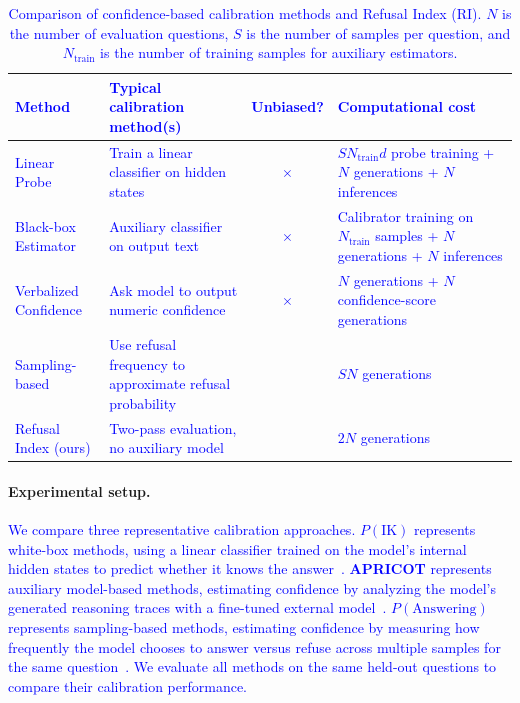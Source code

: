 \documentclass{article} %
\theoremstyle{definition}
\newcommand{\wigglyblue}[1]{\textcolor{blue}{#1}}
\begin{document}
\begin{table}[t]
    \centering
    \footnotesize
    \caption{\wigglyblue{Comparison of confidence-based calibration methods and Refusal Index (RI). $N$ is the number of evaluation questions, $S$ is the number of samples per question, and $N_{\text{train}}$ is the number of training samples for auxiliary estimators.}}%
    \vspace{-0.5em}
    \begin{tabularx}{\textwidth}{>{\raggedright\arraybackslash}p{2.2cm} >{\raggedright\arraybackslash}p{3.8cm} c X}
        \toprule
        \wigglyblue{\textbf{Method}} &
        \wigglyblue{\textbf{Typical calibration method(s)}} &
        \wigglyblue{\textbf{Unbiased?}} &
        \wigglyblue{\textbf{Computational cost}} \\
        \midrule
        \wigglyblue{Linear Probe} &
        \wigglyblue{Train a linear classifier on hidden states} &
        \wigglyblue{$\times$} &
        \wigglyblue{$S N_{\text{train}} d$ probe training + $N$ generations + $N$ inferences} \\
        \wigglyblue{Black-box Estimator} &
        \wigglyblue{Auxiliary classifier on output text} &
        \wigglyblue{$\times$} &
        \wigglyblue{Calibrator training on $N_{\text{train}}$ samples + $N$ generations + $N$ inferences} \\
        \wigglyblue{Verbalized Confidence} &
        \wigglyblue{Ask model to output numeric confidence} &
        \wigglyblue{$\times$} &
        \wigglyblue{$N$ generations + $N$ confidence-score generations} \\
        \wigglyblue{Sampling-based} &
        \wigglyblue{Use refusal frequency to approximate refusal probability} &
        \wigglyblue{\checkmark} &
        \wigglyblue{$S N$ generations} \\
        \wigglyblue{Refusal Index (ours)} &
        \wigglyblue{Two-pass evaluation, no auxiliary model} &
        \wigglyblue{\checkmark} &
        \wigglyblue{$2N$ generations} \\
        \bottomrule
    \end{tabularx}
    \label{tab:calibration_comparison}
\end{table}

\paragraph{Experimental setup.}
\wigglyblue{We compare three representative calibration approaches.
\textbf{$P(\mathrm{IK})$} represents white-box methods, using a linear classifier trained on the model's internal hidden states to predict whether it knows the answer~\citep{kadavath2022mostlyknow}.
\textbf{APRICOT} represents auxiliary model-based methods, estimating confidence by analyzing the model's generated reasoning traces with a fine-tuned external model~\citep{ulmer2024apricot}.
\textbf{$P(\mathrm{Answering})$} represents sampling-based methods, estimating confidence by measuring how frequently the model chooses to answer versus refuse across multiple samples for the same question~\citep{wei2024simpleqa}.
We evaluate all methods on the same held-out questions to compare their calibration performance.}
\end{document}
